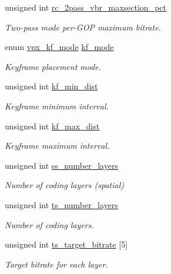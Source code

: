 \begin{DoxyCompactItemize}
unsigned int \hyperlink{structvpx__codec__enc__cfg_ab5212050b71b2d9f4dc663caa496949e}{rc\-\_\-2pass\-\_\-vbr\-\_\-maxsection\-\_\-pct}
\begin{DoxyCompactList}\small\item\em \-Two-\/pass mode per-\/\-G\-O\-P maximum bitrate. \end{DoxyCompactList}\item 
enum \hyperlink{group__encoder_ga9f461802aa4db35c04a8b23837987f40}{vpx\-\_\-kf\-\_\-mode} \hyperlink{structvpx__codec__enc__cfg_a491d67f061dcdb13f60c017563e9d788}{kf\-\_\-mode}
\begin{DoxyCompactList}\small\item\em \-Keyframe placement mode. \end{DoxyCompactList}\item 
unsigned int \hyperlink{structvpx__codec__enc__cfg_a0a7b5444ecb09745cbe8d5af17553846}{kf\-\_\-min\-\_\-dist}
\begin{DoxyCompactList}\small\item\em \-Keyframe minimum interval. \end{DoxyCompactList}\item 
unsigned int \hyperlink{structvpx__codec__enc__cfg_ae018440136e271743376730413d25a9b}{kf\-\_\-max\-\_\-dist}
\begin{DoxyCompactList}\small\item\em \-Keyframe maximum interval. \end{DoxyCompactList}\item 
unsigned int \hyperlink{structvpx__codec__enc__cfg_a1e5e1d00b22f2ba8c5c7230f31900f95}{ss\-\_\-number\-\_\-layers}
\begin{DoxyCompactList}\small\item\em \-Number of coding layers (spatial) \end{DoxyCompactList}\item 
unsigned int \hyperlink{structvpx__codec__enc__cfg_a16d4549a30cbd585e3c3056ef873d8c7}{ts\-\_\-number\-\_\-layers}
\begin{DoxyCompactList}\small\item\em \-Number of coding layers. \end{DoxyCompactList}\item 
unsigned int \hyperlink{structvpx__codec__enc__cfg_aba7ceb7a90500a8f76aff89575737f3a}{ts\-\_\-target\-\_\-bitrate} \mbox{[}5\mbox{]}
\begin{DoxyCompactList}\small\item\em \-Target bitrate for each layer. \end{DoxyCompactList}\item 

\end{DoxyCompactItemize}
